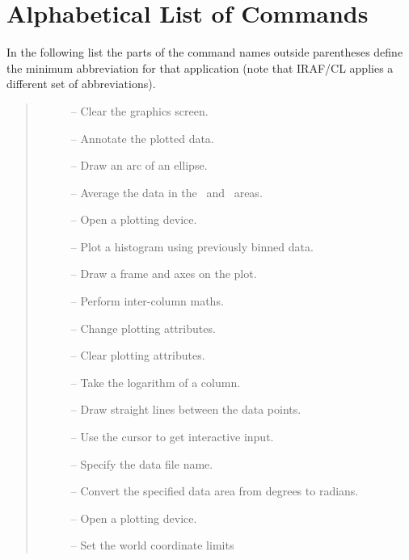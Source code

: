 %
%
\appendix

\newpage
\section{Alphabetical List of Commands}

In the following list the parts of the command names outside parentheses
define the minimum abbreviation for that application (note that IRAF/CL applies
a different set of abbreviations).
\small
\begin {quote}
\begin {description}
\item [] -- Clear the graphics screen.
\item [] -- Annotate the plotted data.
\item [] -- Draw an arc of an ellipse.
\item [] -- Average the data in the \xcol\ and \ycol\ areas.
\item [] -- Open a plotting device.
\item [] -- Plot a histogram using previously binned data.
\item [] -- Draw a frame and axes on the plot.
\item [] -- Perform inter-column maths.
\item [] -- Change plotting attributes.
\item [] -- Clear plotting attributes.
\item [] -- Take the logarithm of a column.
\item [] -- Draw straight lines between the
                                             data points.
\item [] -- Use the cursor to get interactive input.
\item [] -- Specify the data file name.
\item [] -- Convert the specified data area from degrees to
                         radians.
\item [] -- Open a plotting device.
\item [] -- Set the world coordinate limits

\end{description}
\end{quote}
